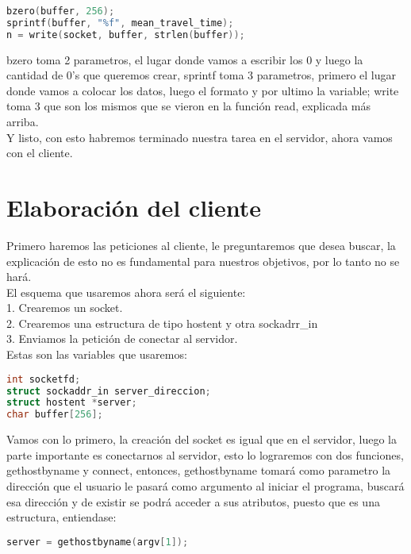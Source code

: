 \documentclass{article}
\begin{document}
\begin{lstlisting}[language=C]
bzero(buffer, 256);
sprintf(buffer, "%f", mean_travel_time);
n = write(socket, buffer, strlen(buffer));
\end{lstlisting}

bzero\cite{man7bzero} toma 2 parametros, el lugar donde vamos a escribir los 0 y luego la cantidad de 0's que queremos crear, sprintf toma 3 parametros, primero el lugar donde vamos a colocar los datos, luego el formato y por ultimo la variable; write toma 3 que son los mismos que se vieron en la función read, explicada más arriba.\\ 
Y listo, con esto habremos terminado nuestra tarea en el servidor, ahora vamos con el cliente.

\section{Elaboración del cliente}

Primero haremos las peticiones al cliente, le preguntaremos que desea buscar, la explicación de esto no es fundamental para nuestros objetivos, por lo tanto no se hará.\\ 
El esquema que usaremos ahora será el siguiente:\\ 
1. Crearemos un socket.\\ 
2. Crearemos una estructura de tipo hostent y otra sockadrr\_in\\ 
3. Enviamos la petición de conectar al servidor.\\ 

Estas son las variables que usaremos:

\begin{lstlisting}[language=C]
int socketfd;
struct sockaddr_in server_direccion;
struct hostent *server;
char buffer[256];
\end{lstlisting}

Vamos con lo primero, la creación del socket es igual que en el servidor, luego la parte importante es conectarnos al servidor, esto lo lograremos con dos funciones, gethostbyname y connect, entonces, gethostbyname tomará como parametro la dirección que el usuario le pasará como argumento al iniciar el programa, buscará esa dirección y de existir se podrá acceder a sus atributos, puesto que es una estructura, entiendase:

\begin{lstlisting}[language=C]
server = gethostbyname(argv[1]);
\end{lstlisting}
\end{document}
